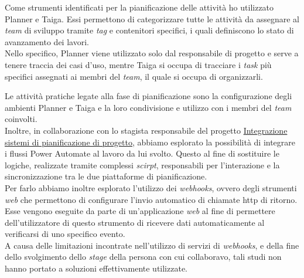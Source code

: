 Come strumenti identificati per la pianificazione delle attività ho utilizzato Planner e Taiga.
Essi permettono di categorizzare tutte le attività da assegnare al \emph{team} di sviluppo tramite \emph{tag} e contenitori specifici, i quali definiscono lo stato di avanzamento dei lavori.\\
Nello specifico, Planner viene utilizzato solo dal responsabile di progetto e serve a tenere traccia dei casi d'uso, mentre Taiga si occupa di tracciare i \emph{task} più specifici assegnati ai membri del \emph{team}, il quale si occupa di organizzarli.
    
Le attività pratiche legate alla fase di pianificazione sono la configurazione degli ambienti Planner e Taiga e la loro condivisione e utilizzo con i membri del \emph{team} coinvolti.\\
Inoltre, in collaborazione con lo stagista responsabile del progetto \hyperref[stageGiacomo]{Integrazione sistemi di pianificazione di progetto}, abbiamo esplorato la possibilità di integrare i flussi Power Automate al lavoro da lui svolto.
Questo al fine di sostituire le logiche, realizzate tramite complessi \emph{scirpt}, responsabili per l'interazione e la sincronizzazione tra le due piattaforme di pianificazione.\\
Per farlo abbiamo inoltre esplorato l'utilizzo dei \emph{webhooks}, ovvero degli strumenti \emph{web} che permettono di configurare l'invio automatico di chiamate \gls{http} di ritorno.
Esse vengono eseguite da parte di un'applicazione \emph{web} al fine di permettere dell'utilizzatore di questo strumento di ricevere dati automaticamente al verificarsi di uno specifico evento.\\
A causa delle limitazioni incontrate nell'utilizzo di servizi di \emph{webhooks}, e della fine dello svolgimento dello \emph{stage} della persona con cui collaboravo, tali studi non hanno portato a soluzioni effettivamente utilizzate.


